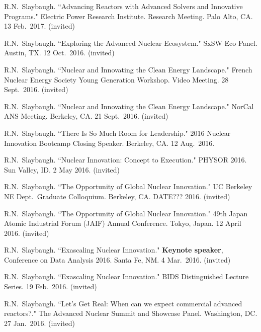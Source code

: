 \begin{bibsection}
\item R.N.\ Slaybaugh. ``Advancing Reactors with Advanced Solvers and Innovative Programs." Electric Power Research Institute. Research Meeting. Palo Alto, CA. 13 Feb.\ 2017. (invited)

\item R.N.\ Slaybaugh. ``Exploring the Advanced Nuclear Ecosystem." SxSW Eco Panel. Austin, TX. 12 Oct.\ 2016. (invited)

\item R.N.\ Slaybaugh. ``Nuclear and Innovating the Clean Energy Landscape." French Nuclear Energy Society Young Generation Workshop. Video Meeting. 28 Sept.\ 2016. (invited)

\item R.N.\ Slaybaugh. ``Nuclear and Innovating the Clean Energy Landscape." NorCal ANS Meeting. Berkeley, CA. 21 Sept.\ 2016. (invited)

\item R.N.\ Slaybaugh. ``There Is So Much Room for Leadership." 2016 Nuclear Innovation Bootcamp Closing Speaker. Berkeley, CA. 12 Aug.\ 2016.\\

\item R.N.\ Slaybaugh. ``Nuclear Innovation: Concept to Execution." PHYSOR 2016. Sun Valley, ID. 2 May 2016. (invited)

\item R.N.\ Slaybaugh. ``The Opportunity of Global Nuclear Innovation." UC Berkeley NE Dept.\ Graduate Colloquium. Berkeley, CA. DATE??? 2016. (invited)

\item R.N.\ Slaybaugh. ``The Opportunity of Global Nuclear Innovation." 49th Japan Atomic Industrial Forum (JAIF) Annual Conference. Tokyo, Japan. 12 April 2016. (invited)

\item R.N.\ Slaybaugh. ``Exascaling Nuclear Innovation." \textbf{Keynote speaker}, Conference on Data Analysis 2016. Santa Fe, NM. 4 Mar.\ 2016. (invited) 

\item R.N.\ Slaybaugh. ``Exascaling Nuclear Innovation." BIDS Distinguished Lecture Series. 19 Feb.\ 2016. (invited) 

\item R.N.\ Slaybaugh. ``Let’s Get Real: When can we expect commercial
advanced reactors?." The Advanced Nuclear Summit and Showcase Panel. Washington, DC. 27 Jan.\ 2016. (invited)


\end{bibsection}
